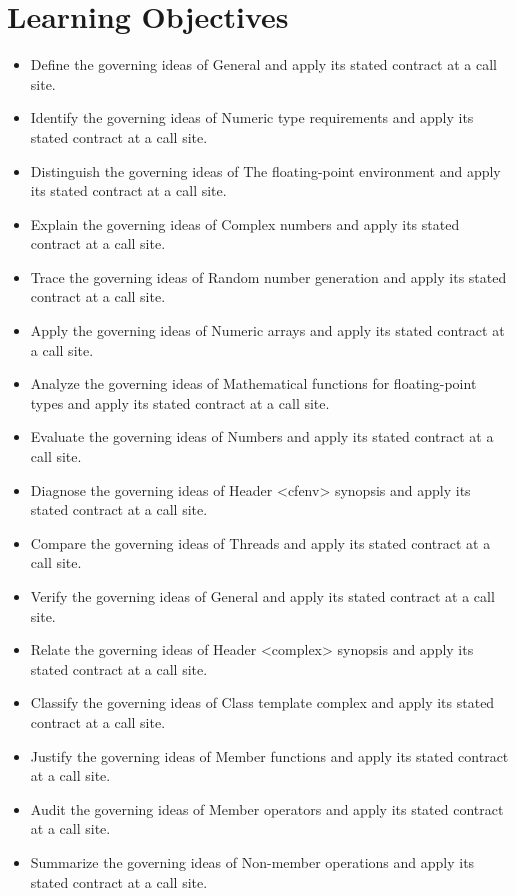 \documentclass[11pt,letterpaper]{article}
\begin{document}
\section{Learning Objectives}
\begin{itemize}[label=\textcolor{CornellReferenceTeal}{$\blacktriangleright$}]
\item Define the governing ideas of General and apply its stated contract at a call site.
\item Identify the governing ideas of Numeric type requirements and apply its stated contract at a call site.
\item Distinguish the governing ideas of The floating-point environment and apply its stated contract at a call site.
\item Explain the governing ideas of Complex numbers and apply its stated contract at a call site.
\item Trace the governing ideas of Random number generation and apply its stated contract at a call site.
\item Apply the governing ideas of Numeric arrays and apply its stated contract at a call site.
\item Analyze the governing ideas of Mathematical functions for floating-point types and apply its stated contract at a call site.
\item Evaluate the governing ideas of Numbers and apply its stated contract at a call site.
\item Diagnose the governing ideas of Header <cfenv> synopsis and apply its stated contract at a call site.
\item Compare the governing ideas of Threads and apply its stated contract at a call site.
\item Verify the governing ideas of General and apply its stated contract at a call site.
\item Relate the governing ideas of Header <complex> synopsis and apply its stated contract at a call site.
\item Classify the governing ideas of Class template complex and apply its stated contract at a call site.
\item Justify the governing ideas of Member functions and apply its stated contract at a call site.
\item Audit the governing ideas of Member operators and apply its stated contract at a call site.
\item Summarize the governing ideas of Non-member operations and apply its stated contract at a call site.
\end{itemize}
\end{document}
